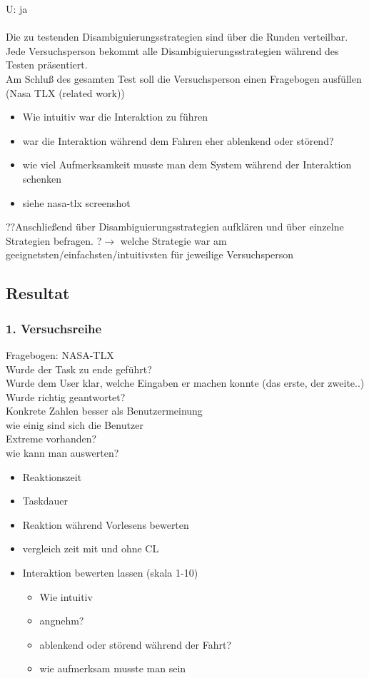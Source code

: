 \documentclass[12pt,a4paper]{scrartcl}
\begin{document}
U: ja
\\
\\
Die zu testenden Disambiguierungsstrategien sind über die Runden verteilbar.\\
Jede Versuchsperson bekommt alle Disambiguierungsstrategien während des Testen präsentiert.\\
Am Schluß des gesamten Test soll die Versuchsperson einen Fragebogen ausfüllen (Nasa TLX (related work))
\begin{itemize}
\item Wie intuitiv war die Interaktion zu führen
\item war die Interaktion während dem Fahren eher ablenkend oder störend?
\item wie viel Aufmerksamkeit musste man dem System während der Interaktion schenken
\item siehe nasa-tlx screenshot
\end{itemize}
??Anschließend über Disambiguierungsstrategien aufklären und über einzelne Strategien befragen.
?$\rightarrow$ welche Strategie war am geeignetsten/einfachsten/intuitivsten für jeweilige Versuchsperson



\subsection{Resultat}
\subsubsection{1. Versuchsreihe}

Fragebogen: NASA-TLX\\
Wurde der Task zu ende geführt?\\
Wurde dem User klar, welche Eingaben er machen konnte (das erste, der zweite..)\\
Wurde richtig geantwortet?\\
Konkrete Zahlen besser als Benutzermeinung \\
wie einig sind sich die Benutzer\\
Extreme vorhanden?\\
wie kann man auswerten?
\begin{itemize}
\item Reaktionszeit
\item Taskdauer
\item Reaktion während Vorlesens bewerten
\item vergleich zeit mit und ohne CL
\item Interaktion bewerten lassen (skala 1-10)
 \begin{itemize}
\item Wie intuitiv 
\item angnehm?
\item ablenkend oder störend während der Fahrt?
\item wie aufmerksam musste man sein 

\end{itemize}
\end{itemize}
\end{document}
